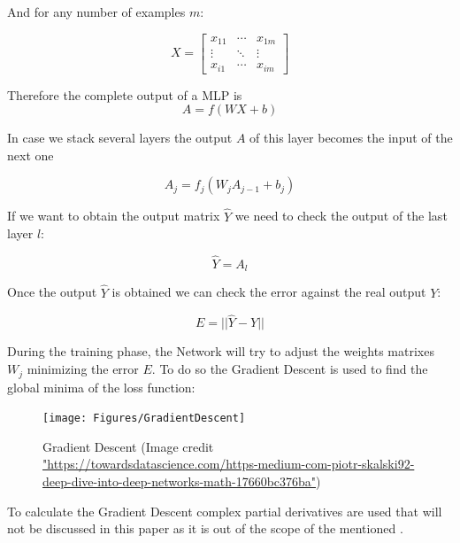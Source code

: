 And for any number of examples $m$:

$$
X=\left[
\begin{array}{ccc}
   x_{11} & \cdots & x_{1m} \\
   \vdots & \ddots & \vdots \\
   x_{i1} & \cdots & x_{im}
\end{array}
\right]
$$

Therefore the complete output of a MLP is
$$ A = f(WX + b) $$


In case we stack several layers the output $A$ of this layer becomes the input of the next one

$$ A_j = f_j(W_jA_{j-1} + b_j) $$

If we want to obtain the output matrix $\hat{Y}$ we need to check the output of the last layer $l$:

$$ \hat{Y} = A_l $$

Once the output $\hat{Y}$ is obtained we can check the error against the real output $Y$:

$$ E = || \hat{Y} - Y || $$

During the training phase, the Network will try to adjust the weights matrixes $W_j$ minimizing the error $E$.
To do so the Gradient Descent is used to find the global minima of the loss function:

\begin{figure}[th]
    \centering
    \texttt{[image: Figures/GradientDescent]}
    \decoRule
    \caption[Gradient Descent]{Gradient Descent (Image credit \url{"https://towardsdatascience.com/https-medium-com-piotr-skalski92-deep-dive-into-deep-networks-math-17660bc376ba"})}
    \label{fig:Gradient Descent}
\end{figure}

To calculate the Gradient Descent complex partial derivatives are used that will not be discussed in this paper as it is out of the scope of the mentioned \cite{Suykens1996}.
